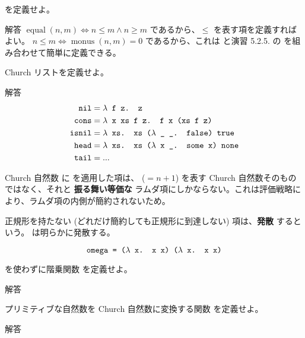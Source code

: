 \begin{jexercise*}[5.2.7]
   を定義せよ。
\end{jexercise*}
\begin{itembox}[l]{解答}
  $\operatorname{equal}(n, m) \iff n \leq m \land n \geq m$ であるから、$\leq$ を表す項を定義すればよい。
  $n \leq m \iff \operatorname{monus}(n, m) = 0$ であるから、これは  と演習 5.2.5. の  を組み合わせて簡単に定義できる。
\end{itembox}

\begin{jexercise*}[5.2.8]
  Church リストを定義せよ。
\end{jexercise*}
\begin{itembox}[l]{解答}
  \begin{align*}
    \text{\texttt{nil}}
      & = \text{\texttt{$\lambda$ f z. z}}
    \\ \text{\texttt{cons}}
      & = \text{\texttt{$\lambda$ x xs f z. f x (xs f z)}}
    \\ \text{\texttt{isnil}}
      & = \text{\texttt{$\lambda$ xs. xs ($\lambda$ \_ \_. false) true}}
    \\ \text{\texttt{head}}
      & = \text{\texttt{$\lambda$ xs. xs ($\lambda$ x \_. some x) none}}
    \\ \text{\texttt{tail}}
      & = ...
  \end{align*}
\end{itembox}

Church 自然数  に  を適用した項は、 ($= n + 1$) を表す Church 自然数そのものではなく、それと {\bf 振る舞い等価な} ラムダ項にしかならない。これは評価戦略により、ラムダ項の内側が簡約されないため。

正規形を持たない (どれだけ簡約しても正規形に到達しない) 項は、{\bf 発散} するという。 は明らかに発散する。

\[
  \text{\texttt{omega = ($\lambda$ x. x x) ($\lambda$ x. x x)}}
\]

\begin{jexercise*}[5.2.9]
   を使わずに階乗関数  を定義せよ。
\end{jexercise*}
\begin{itembox}[l]{解答}
\end{itembox}

\begin{jexercise*}[5.2.10]
  プリミティブな自然数を Church 自然数に変換する関数  を定義せよ。
\end{jexercise*}
\begin{itembox}[l]{解答}
\end{itembox}

